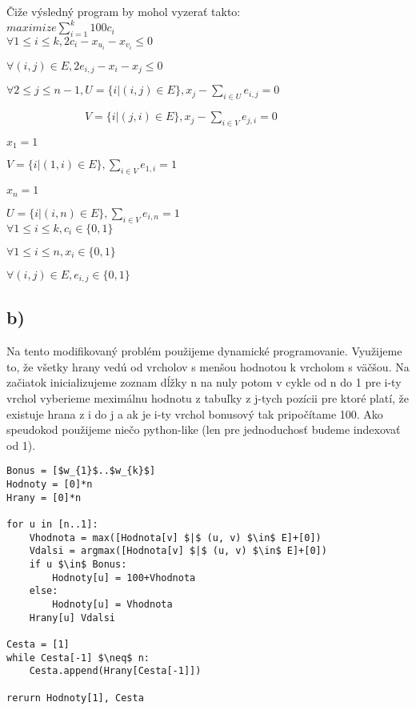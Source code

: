 \documentclass[a4paper]{article}
\begin{document}
Čiže výsledný program by mohol vyzerať takto:
\\

$maximize \sum_{i=1}^{k} 100 c_i$
\\

$\forall 1 \leq i \leq k, 2 c_i - x_{u_i} - x_{v_i} \leq 0$

$\forall (i, j) \in E, 2 e_{i,j} - x_{i} - x_{j} \leq 0$

$\forall 2 \leq j \leq n-1, U = \{ i | (i, j) \in E \}, x_{j} - \sum_{i \in U}^{}e_{i,j} = 0$

$\quad \quad \quad \quad \quad \quad \quad V = \{ i | (j, i) \in E \}, x_{j} - \sum_{i \in V}^{}e_{j,i} = 0$

$x_1 = 1$

$V = \{ i | (1, i) \in E \}, \sum_{i \in V}^{}e_{1,i} = 1$

$x_n = 1$

$U = \{ i | (i, n) \in E \}, \sum_{i \in V}^{}e_{i,n} = 1$
\\

$\forall 1 \leq i \leq k, c_i \in \{0,1\}$

$\forall 1 \leq i \leq n, x_i \in \{0,1\}$

$\forall (i, j) \in E, e_{i,j} \in \{0,1\}$

\newpage
\subsection*{b)}
 
Na tento modifikovaný problém použijeme dynamické programovanie. Využijeme to, že všetky hrany vedú od vrcholov s menšou hodnotou k vrcholom s väčšou. Na začiatok inicializujeme zoznam dĺžky n na nuly potom v cykle od n do 1 pre i-ty vrchol vyberieme meximálnu hodnotu z tabuľky z j-tych pozícii pre ktoré platí, že existuje hrana z i do j a ak je i-ty vrchol bonusový tak pripočítame 100. Ako speudokod použijeme niečo python-like (len pre jednoduchosť budeme indexovať od 1).

\begin{lstlisting}
Bonus = [$w_{1}$..$w_{k}$]
Hodnoty = [0]*n
Hrany = [0]*n

for u in [n..1]:
	Vhodnota = max([Hodnota[v] $|$ (u, v) $\in$ E]+[0])
	Vdalsi = argmax([Hodnota[v] $|$ (u, v) $\in$ E]+[0])
	if u $\in$ Bonus:
		Hodnoty[u] = 100+Vhodnota
	else:
		Hodnoty[u] = Vhodnota
	Hrany[u] Vdalsi

Cesta = [1]
while Cesta[-1] $\neq$ n:
	Cesta.append(Hrany[Cesta[-1]])

rerurn Hodnoty[1], Cesta 

\end{lstlisting}
\end{document}
